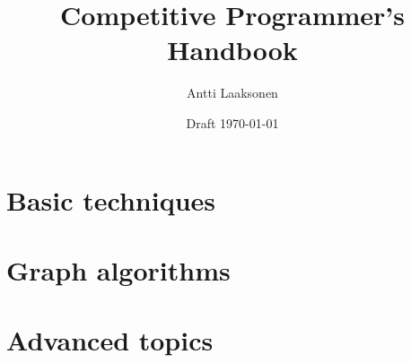 \documentclass[twoside,14pt,english]{book}
\date{Draft \today}
\title{\Huge Competitive Programmer's Handbook}
\author{\Large Antti Laaksonen}
\begin{document}


\frontmatter
\maketitle
\setcounter{tocdepth}{1}
\tableofcontents



\mainmatter
{}
\setcounter{page}{1}

\newcommand{\key}[1] {\textbf{#1}}

\part{Basic techniques}










\part{Graph algorithms}










\part{Advanced topics}











\cleardoublepage
{}
{}


\cleardoublepage
\printindex
\end{document}
